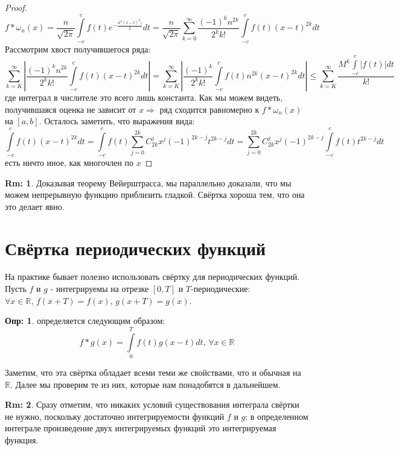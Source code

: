 \documentclass[12pt]{article}
\newcommand{\MR}{\mathbb{R}}
\theoremstyle{definition}
\newtheorem{defn}{Опр:}
\newtheorem{rem}{Rm:}
\newcommand{\ddsum}[2]{\displaystyle\sum\limits_{#1}^{#2}}
\newcommand{\ddint}[2]{\displaystyle\int\limits_{#1}^{#2}}
\begin{document}
\begin{proof}
	$$
		f*\omega_n(x) = \dfrac{n}{\sqrt{2 \pi}}\ddint{-c}{c}f(t)e^{-\tfrac{n^2(x-t)^2)}{2}}dt = \dfrac{n}{\sqrt{2 \pi}}\ddsum{k = 0}{\infty}\dfrac{(-1)^k n^{2k}}{2^k k!}\ddint{-c}{c}f(t)(x-t)^{2k}dt
	$$
	Рассмотрим хвост получившегося ряда:
	$$
		\ddsum{k = K}{\infty}\left|\dfrac{(-1)^k n^{2k}}{2^k k!}\ddint{-c}{c}f(t)(x-t)^{2k}dt\right| = \ddsum{k = K}{\infty}\left|\dfrac{(-1)^k}{2^k k!}\ddint{-c}{c}f(t)n^{2k}(x-t)^{2k}dt\right| 
		\leq \ddsum{k = K}{\infty}\dfrac{M^{k}\int\limits_{-c}^{c}|f(t)|dt}{k!}
	$$	
	где интеграл в числителе это всего лишь константа. Как мы можем видеть, получившаяся оценка не зависит от $x \Rightarrow$ ряд сходится равномерно к $f*\omega_n(x)$ на $[a,b]$. Осталось заметить, что выражения вида:
	$$
		\ddint{-c}{c}f(t)(x-t)^{2k}dt = \ddint{-c}{c}f(t)\ddsum{j = 0}{2k}C_{2k}^{j}x^j(-1)^{2k-j}t^{2k-j}dt = \ddsum{j = 0}{2k}C_{2k}^{j}x^j(-1)^{2k-j}\ddint{-c}{c}f(t)t^{2k-j}dt
	$$
	есть ничто иное, как многочлен по $x$
\end{proof}
\begin{rem}
	Доказывая теорему Вейерштрасса, мы параллельно доказали, что мы можем непрерывную функцию приблизить гладкой. Свёртка хороша тем, что она это делает явно.
\end{rem}

\newpage
\section*{Свёртка периодических функций}
На практике бывает полезно использовать свёртку для периодических функций. Пусть $f$ и $g$ - интегрируемы на отрезке $[0,T]$ и $T$-периодические: $\forall x \in \MR, \, f(x + T) = f(x), \, g(x + T) = g(x)$.
\begin{defn}
	 определяется следующим образом:
	$$
		f*g(x) = \ddint{0}{T}f(t)g(x - t)dt, \, \forall x \in \MR
	$$
\end{defn}
Заметим, что эта свёртка обладает всеми теми же свойствами, что и обычная на $\MR$. Далее мы проверим те из них, которые нам понадобятся в дальнейшем.
\begin{rem}
	Сразу отметим, что никаких условий существования интеграла свёртки не нужно, поскольку достаточно интегрируемости функций $f$ и $g$: в определенном интеграле произведение двух интегрируемых функций это интегрируемая функция.
\end{rem}
\end{document}
